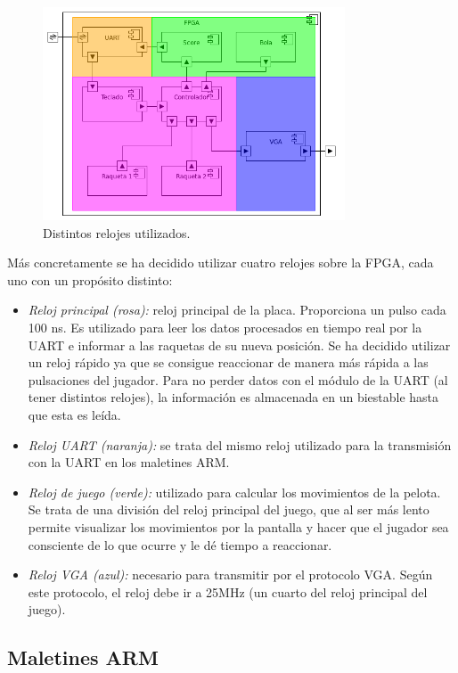 \begin{figure}[h]
  \centering
  \includegraphics[width=0.8\textwidth]{images/fpga_componentes_timing_v2.png}
  \caption{Distintos relojes utilizados.}
  \label{s3:fig:componentes-fpga-clocking}
\end{figure}


Más concretamente se ha decidido utilizar cuatro relojes sobre la FPGA,
cada uno con un propósito distinto:
\begin{itemize}
\item \emph{Reloj principal (rosa):} reloj principal de la
  placa. Proporciona un pulso cada 100 ns. Es utilizado para leer los datos
  procesados en tiempo real por la UART e informar a las raquetas de su
  nueva posición. Se ha decidido utilizar un reloj rápido ya que se
  consigue reaccionar de manera más rápida a las pulsaciones del
  jugador. Para no perder datos con el módulo de la UART (al tener
  distintos relojes), la información es almacenada en un biestable hasta
  que esta es leída.
\item \emph{Reloj UART (naranja):} se trata del mismo reloj utilizado para
  la transmisión con la UART en los maletines ARM.
\item \emph{Reloj de juego (verde):} utilizado para calcular los
  movimientos de la pelota. Se trata de una división del reloj principal
  del juego, que al ser más lento permite visualizar los movimientos por la
  pantalla y hacer que el jugador sea consciente de lo que ocurre y le dé
  tiempo a reaccionar.
\item \emph{Reloj VGA (azul):} necesario para transmitir por el
  protocolo VGA. Según este protocolo, el reloj debe ir a 25MHz (un cuarto
  del reloj principal del juego).
\end{itemize}

\subsection{Maletines ARM}
\label{s3:subsec:maletines}
\\

